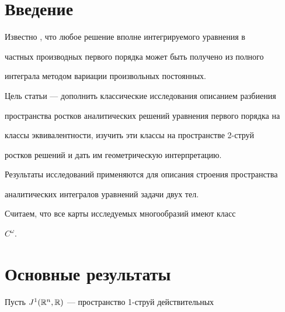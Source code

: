 




\maketitle


\label{begin}








\section*{Введение}





Известно \cite{R1}, что любое решение вполне интегрируемого уравнения в


частных производных первого порядка может быть получено из полного


интеграла методом вариации произвольных постоянных.





Цель статьи --- дополнить классические исследования описанием разбиения


пространства ростков аналитических решений уравнения первого порядка на


классы эквивалентности, изучить эти классы на пространстве 2-струй


ростков решений и дать им геометрическую интерпретацию.


Результаты исследований применяются для описания строения пространства


аналитических интегралов уравнений задачи двух тел.





Считаем, что все карты исследуемых многообразий имеют класс


$C^\omega$.





\section{Основные результаты}





Пусть $J^1(\Bbb R^n,\Bbb R)$ --- пространство 1-струй действительных


